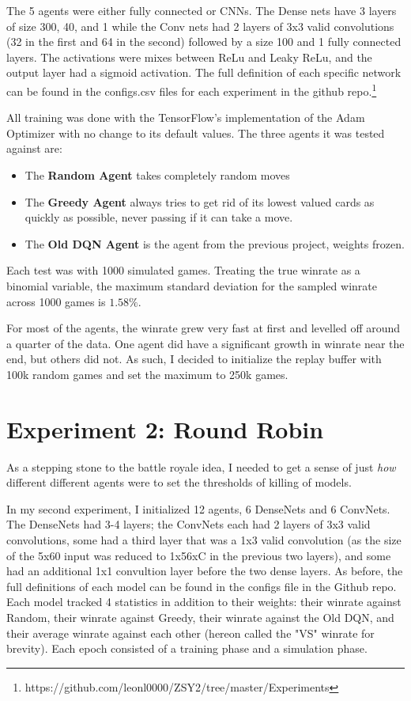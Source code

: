 \documentclass{article}
\begin{document}
The 5 agents were either fully connected or CNNs. The Dense nets have 3 layers of size 300, 40, and 1 while the Conv nets had 2 layers of 3x3 valid convolutions (32 in the first and 64 in the second) followed by a size 100 and 1 fully connected layers. The activations were mixes between ReLu and Leaky ReLu, and the output layer had a sigmoid activation. The full definition of each specific network can be found in the configs.csv files for each experiment in the github repo.\footnote{https://github.com/leonl0000/ZSY2/tree/master/Experiments}

All training was done with the TensorFlow's implementation of the Adam Optimizer with no change to its default values. The three agents it was tested against are:
\begin{itemize}
\item The \textbf{Random Agent} takes completely random moves
\item The \textbf{Greedy Agent} always tries to get rid of its lowest valued cards as quickly as possible, never passing if it can take a move.
\item The \textbf{Old DQN Agent} is the agent from the previous project, weights frozen.
\end{itemize}
Each test was with 1000 simulated games. Treating the true winrate as a binomial variable, the maximum standard deviation for the sampled winrate across 1000 games is $1.58\%$.

For most of the agents, the winrate grew very fast at first and levelled off around a quarter of the data. One agent did have a significant growth in winrate near the end, but others did not. As such, I decided to initialize the replay buffer with 100k random games and set the maximum to 250k games.

\section{Experiment 2: Round Robin}
As a stepping stone to the battle royale idea, I needed to get a sense of just \textit{how} different different agents were to set the thresholds of killing of models.

In my second experiment, I initialized 12 agents, 6 DenseNets and 6 ConvNets. The DenseNets had 3-4 layers; the ConvNets each had 2 layers of 3x3 valid convolutions, some had a third layer that was a 1x3 valid convolution (as the size of the 5x60 input was reduced to 1x56xC in the previous two layers), and some had an additional 1x1 convultion layer before the two dense layers. As before, the full definitions of each model can be found in the configs file in the Github repo. Each model tracked 4 statistics in addition to their weights: their winrate against Random, their winrate against Greedy, their winrate against the Old DQN, and their average winrate against each other (hereon called the "VS" winrate for brevity). Each epoch consisted of a training phase and a simulation phase. 
\end{document}
